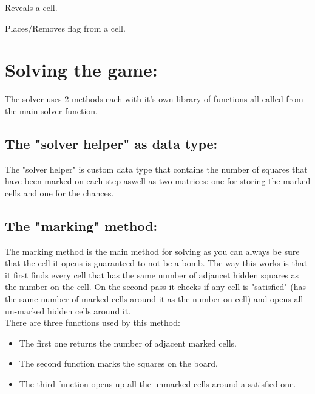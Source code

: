 \documentclass{report}
\begin{document}
\begin{algorithm}[H]
    \caption{Reveals a cell.}
\end{algorithm}

\begin{algorithm}[H]
    \caption{Places/Removes flag from a cell.}
\end{algorithm}

\section*{Solving the game:}
The solver uses 2 methods each with it's own library of functions all called from the main solver function.

\subsection*{The "solver helper" as data type:}
The "solver helper" is custom data type that contains the number of squares that have been marked on each step aswell as two matrices:
one for storing the marked cells and one for the chances.

\subsection*{The "marking" method:}
The marking method is the main method for solving as you can always be sure that the cell it opens is guaranteed to not be a bomb. The way this works
is that it first finds every cell that has the same number of adjancet hidden squares as the number on the cell. On the second pass it checks if
any cell is "satisfied" (has the same number of marked cells around it as the number on cell) and opens all un-marked hidden cells around it.\\
There are three functions used by this method:
\begin{itemize}
    \item The first one returns the number of adjacent marked cells.
    \item The second function marks the squares on the board.
    \item The third function opens up all the unmarked cells around a satisfied one.
\end{itemize}
\end{document}
